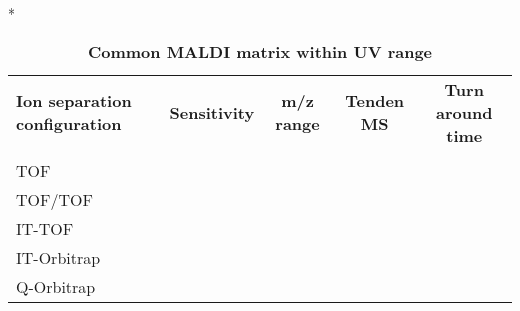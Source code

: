 \begin{table}{*}
\caption{\textbf{Common MALDI matrix within UV range}}
\label{tab:matrix}

\centering 
\scriptsize

\begin{tabular}{|l|c|c|c|c|}
    \hline 
    \textbf{Ion separation configuration} & \textbf{Sensitivity} & \textbf{m/z range} & \textbf{Tenden MS} & \textbf{Turn around time} \\ \\
    TOF & \\
    TOF/TOF \\
    IT-TOF \\
    IT-Orbitrap \\
    Q-Orbitrap \\
    \hline \hline 
\end{tabular}
\end{table}